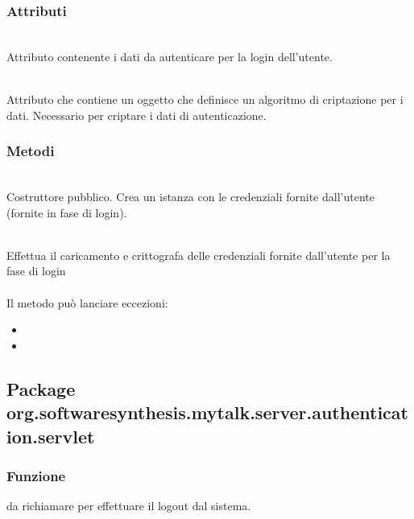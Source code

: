 \subsubsection*{Attributi}
\begin{description}
  \item{}\\
  Attributo contenente i dati da autenticare per la login dell'utente.
  \item{}\\
  Attributo che contiene un oggetto che definisce un algoritmo di criptazione per i dati. Necessario per criptare i dati di autenticazione.
\end{description}

\subsubsection*{Metodi}
\begin{description}
	\item{}\\
	Costruttore pubblico. Crea un istanza con le credenziali fornite dall'utente (fornite in fase di login).

	\item{}\\
	Effettua il caricamento e crittografa delle credenziali fornite dall'utente per la fase di login\\\\
	Il metodo può lanciare eccezioni:
	\begin{itemize}
		\item {}
		\item {}
	\end{itemize}

\end{description}

\subsection{Package org.softwaresynthesis.mytalk.server.authentication.servlet}\label{sec:autservlet}


\subsubsection*{Funzione}
 da richiamare per effettuare il logout dal sistema.


